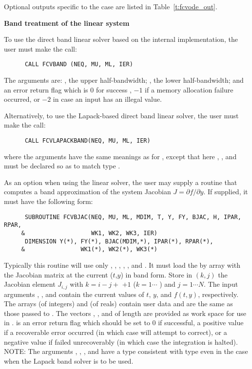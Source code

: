 \begin{Steps}
  Optional outputs specific to the {\dense} case are listed in
  Table~\ref{t:fcvode_out}.


  {\bf Band treatment of the linear system}
  
  To use the direct band linear solver based on the internal {\cvode}
  implementation, the user must make the call:
\begin{verbatim}
      CALL FCVBAND (NEQ, MU, ML, IER)
\end{verbatim}
  The arguments are: , the upper half-bandwidth; , 
  the lower half-bandwidth; and  an error return flag which is 
  $0$ for success , $-1$ if a memory allocation failure occurred, or $-2$ 
  in case an input has an illegal value.     
  
  Alternatively, to use the Lapack-based direct band linear solver, 
  the user must make the call:
\begin{verbatim}
      CALL FCVLAPACKBAND(NEQ, MU, ML, IER)
\end{verbatim}
  where the arguments have the same meanings as for , except
  that here , , and  must be declared so as to match
  {\CC} type .

  As an option when using the {\band} linear solver, the user may supply a
  routine that computes a band approximation of the system Jacobian 
  $J = \partial f / \partial y$. If supplied, it must have the following form:
\begin{verbatim}
      SUBROUTINE FCVBJAC(NEQ, MU, ML, MDIM, T, Y, FY, BJAC, H, IPAR, RPAR,
     &                   WK1, WK2, WK3, IER)
      DIMENSION Y(*), FY(*), BJAC(MDIM,*), IPAR(*), RPAR(*),
     &                WK1(*), WK2(*), WK3(*)
\end{verbatim}
  Typically this routine will use only , , , , 
  , and .
  It must load the  by  array  with the Jacobian matrix
  at the current ($t$,$y$) in band form.  Store in $(k,j)$ the Jacobian
  element $J_{i,j}$ with $k = i - j + $  $ + 1$ ($k = 1 \cdots $
  ) and $j = 1 \cdots N$.
  The input arguments , , and  contain the current
  values of $t$, $y$, and $f(t,y)$, respectively.
  The arrays  (of integers) and  (of reals) contain user data
  and are the same as those passed to .
  The vectors , ,
  and  of length  are provided as work space for use in
  .
   is an error return flag which should be set to $0$ if successful, 
  a positive value if a recoverable error occurred (in which case {\cvode} will 
  attempt to correct), or a negative value if  failed unrecoverably 
  (in which case the integration is halted).
  NOTE: The arguments , , , and  have a type
  consistent with {\CC} type  even in the case when the Lapack band
  solver is to be used.


\end{Steps}
